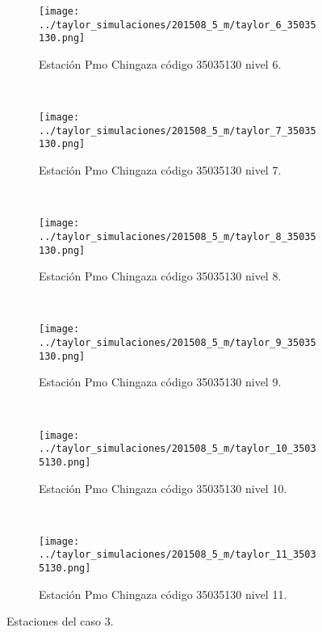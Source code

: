 \begin{figure}[H]\ContinuedFloat
\centering
\begin{subfigure}[normla]{0.4\textwidth}
\caption{Estación Pmo Chingaza  código 35035130 nivel 6.}
\texttt{[image: ../taylor\_simulaciones/201508\_5\_m/taylor\_6\_35035130.png]}
\end{subfigure}
~
\begin{subfigure}[normla]{0.4\textwidth}
\caption{Estación Pmo Chingaza  código 35035130 nivel 7.}
\texttt{[image: ../taylor\_simulaciones/201508\_5\_m/taylor\_7\_35035130.png]}
\end{subfigure}
~
\begin{subfigure}[normla]{0.4\textwidth}
\caption{Estación Pmo Chingaza  código 35035130 nivel 8.}
\texttt{[image: ../taylor\_simulaciones/201508\_5\_m/taylor\_8\_35035130.png]}
\end{subfigure}
~
\begin{subfigure}[normla]{0.4\textwidth}
\caption{Estación Pmo Chingaza  código 35035130 nivel 9.}
\texttt{[image: ../taylor\_simulaciones/201508\_5\_m/taylor\_9\_35035130.png]}
\end{subfigure}
~
\begin{subfigure}[normla]{0.4\textwidth}
\caption{Estación Pmo Chingaza  código 35035130 nivel 10.}
\texttt{[image: ../taylor\_simulaciones/201508\_5\_m/taylor\_10\_35035130.png]}
\end{subfigure}
~
\begin{subfigure}[normla]{0.4\textwidth}
\caption{Estación Pmo Chingaza  código 35035130 nivel 11.}
\texttt{[image: ../taylor\_simulaciones/201508\_5\_m/taylor\_11\_35035130.png]}
\end{subfigure}

\caption{Estaciones del caso 3.}
\label{estaciones_caso1}
\end{figure}




